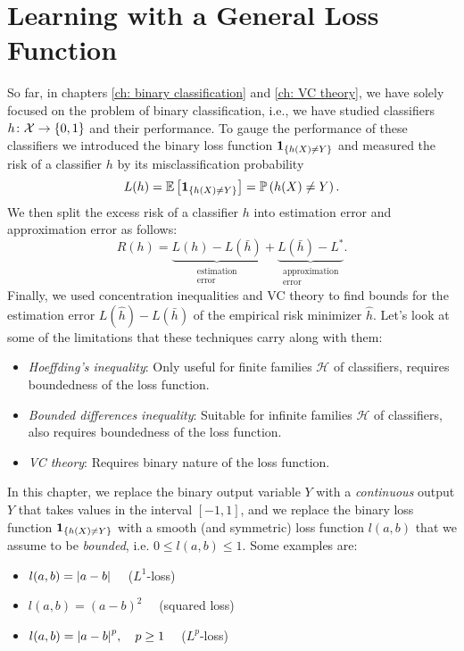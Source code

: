 \chapter{Learning with a General Loss Function}

So far, in chapters \ref{ch: binary classification} and \ref{ch: VC theory}, we have solely focused on the problem of binary classification, i.e., we have studied classifiers $h \colon \mathcal{X} \to \left\{0, 1\right\}$ and their performance. To gauge the performance of these classifiers we introduced the binary loss function $\mathbf{1}_{\left\{h(X) \neq Y\right\}}$ and measured the risk of a classifier $h$ by its misclassification probability
\[
    L(h) = \mathbb{E}\left[\mathbf{1}_{\left\{h(X) \neq Y\right\}}\right] = \mathbb{P}\left(h(X) \neq Y\right).
\]
We then split the excess risk of a classifier $h$ into estimation error and approximation error as follows:
\[
    R(h) = \underbrace{L(h) - L(\bar h)}_{\substack{\text{estimation} \\ \text{error}}} + \underbrace{L(\bar h) - L^*}_{\substack{\text{approximation} \\ \text{error}}}.
\]
Finally, we used concentration inequalities and VC theory to find bounds for the estimation error $L(\hat h) - L(\bar h)$ of the empirical risk minimizer $\hat h$. Let's look at some of the limitations that these techniques carry along with them:

\begin{itemize}
    \item \emph{Hoeffding's inequality}: Only useful for finite families $\mathcal{H}$ of classifiers, requires boundedness of the loss function.

    \item \emph{Bounded differences inequality}: Suitable for infinite families $\mathcal{H}$ of classifiers, also requires boundedness of the loss function.

    \item \emph{VC theory}: Requires binary nature of the loss function.
\end{itemize}

In this chapter, we replace the binary output variable $Y$ with a \emph{continuous} output $Y$ that takes values in the interval $[-1, 1]$, and we replace the binary loss function $\mathbf{1}_{\left\{h(X) \neq Y\right\}}$ with a smooth (and symmetric) loss function $l(a, b)$ that we assume to be \emph{bounded}, i.e. $0 \leq l(a, b) \leq 1$. Some examples are:

\begin{itemize}
    \item $l(a, b) = \abs{a - b} \quad$ ($L^1$-loss)
    
    \item $l(a, b) = (a - b)^2 \quad$ (squared loss)

    \item $l(a, b) = \abs{a - b}^p, \quad p \geq 1 \quad$ ($L^p$-loss)
\end{itemize}

